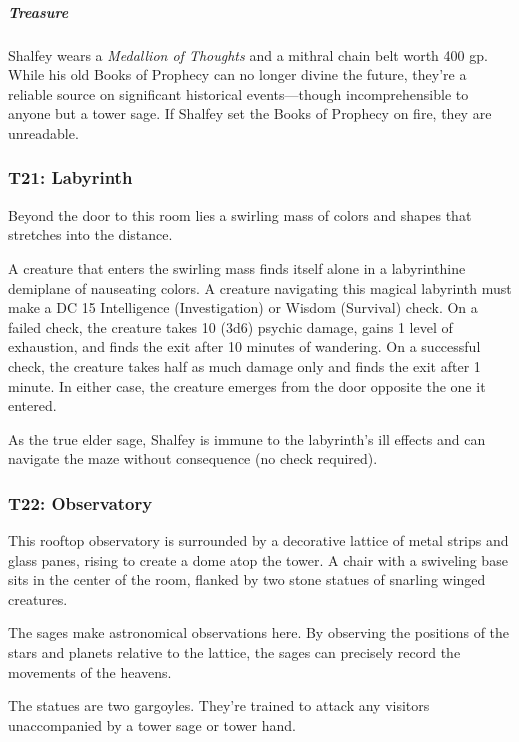 \documentclass[10pt,a4paper,twoside,bg=print,twocolumn,openany,nodeprecatedcode]{dndbook}
\begin{document}
\subparagraph{Treasure}
Shalfey wears a \textit{Medallion of Thoughts} and a mithral chain belt worth 400 gp. While his old Books of Prophecy can no longer divine the future, they're a reliable source on significant historical events—though incomprehensible to anyone but a tower sage. If Shalfey set the Books of Prophecy on fire, they are unreadable.

\subsubsection{T21: Labyrinth}
\begin{DndReadAloud}{}
Beyond the door to this room lies a swirling mass of colors and shapes that stretches into the distance.

\end{DndReadAloud}

A creature that enters the swirling mass finds itself alone in a labyrinthine demiplane of nauseating colors. A creature navigating this magical labyrinth must make a DC 15 Intelligence (Investigation) or Wisdom (Survival) check. On a failed check, the creature takes 10 (3d6) psychic damage, gains 1 level of exhaustion, and finds the exit after 10 minutes of wandering. On a successful check, the creature takes half as much damage only and finds the exit after 1 minute. In either case, the creature emerges from the door opposite the one it entered.

As the true elder sage, Shalfey is immune to the labyrinth's ill effects and can navigate the maze without consequence (no check required).

\subsubsection{T22: Observatory}
\begin{DndReadAloud}{}
This rooftop observatory is surrounded by a decorative lattice of metal strips and glass panes, rising to create a dome atop the tower. A chair with a swiveling base sits in the center of the room, flanked by two stone statues of snarling winged creatures.

\end{DndReadAloud}

The sages make astronomical observations here. By observing the positions of the stars and planets relative to the lattice, the sages can precisely record the movements of the heavens.

The statues are two gargoyles. They're trained to attack any visitors unaccompanied by a tower sage or tower hand.
\end{document}
